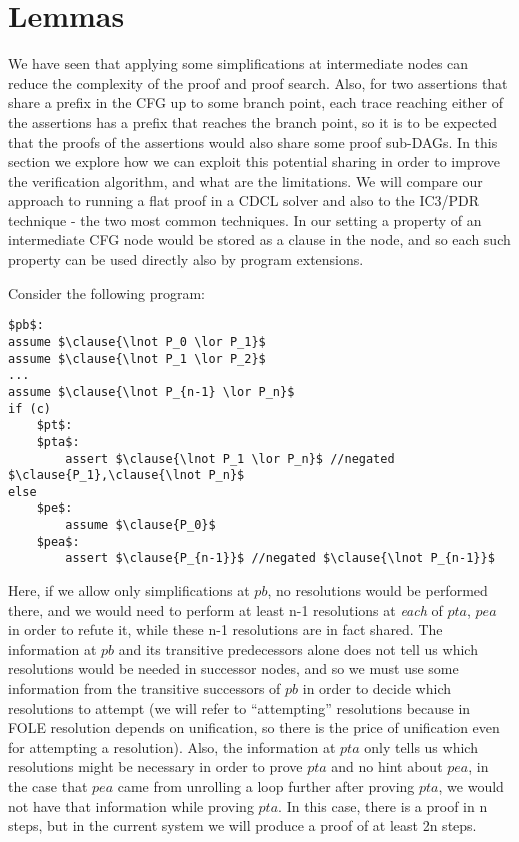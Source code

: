 \section{Lemmas}
We have seen that applying some simplifications at intermediate nodes can reduce the complexity of the proof and proof search. 
Also, for two assertions that share a prefix in the CFG up to some branch point, each trace reaching either of the assertions has a prefix that reaches the branch point, so it is to be expected that the proofs of the assertions would also share some proof sub-DAGs.
In this section we explore how we can exploit this potential sharing in order to improve the verification algorithm, and what are the limitations.
We will compare our approach to running a flat proof in a CDCL solver and also to the IC3/PDR technique - the two most common techniques.
In our setting a property of an intermediate CFG node would be stored as a clause in the node, and so each such property can be used directly also by program extensions.

Consider the following program:
\begin{lstlisting}[mathescape]
$pb$: 
assume $\clause{\lnot P_0 \lor P_1}$
assume $\clause{\lnot P_1 \lor P_2}$
...
assume $\clause{\lnot P_{n-1} \lor P_n}$
if (c)
	$pt$:
	$pta$:
		assert $\clause{\lnot P_1 \lor P_n}$ //negated $\clause{P_1},\clause{\lnot P_n}$
else
	$pe$:
		assume $\clause{P_0}$
	$pea$:
		assert $\clause{P_{n-1}}$ //negated $\clause{\lnot P_{n-1}}$
\end{lstlisting}

Here, if we allow only simplifications at $pb$, no resolutions would be performed there, and we would need to perform at least n-1 resolutions at \emph{each} of $pta$, $pea$ in order to refute it, while these n-1 resolutions are in fact shared.
The information at $pb$ and its transitive predecessors alone does not tell us which resolutions would be needed in successor nodes, and so we must use some information from the transitive successors of $pb$ in order to decide which resolutions to attempt (we will refer to ``attempting'' resolutions because in FOLE resolution depends on unification, so there is the price of unification even for attempting a resolution).
Also, the information at $pta$ only tells us which resolutions might be necessary in order to prove $pta$ and no hint about $pea$, in the case that $pea$ came from unrolling a loop further after proving $pta$, we would not have that information while proving $pta$.
In this case, there is a proof in n steps, but in the current system we will produce a proof of at least 2n steps.

